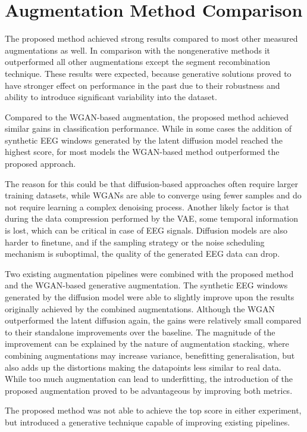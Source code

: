 \section{Augmentation Method Comparison}

The proposed method achieved strong results compared to most other measured augmentations as well. In comparison with the nongenerative methods it outperformed all other augmentations except the segment recombination technique. These results were expected, because generative solutions proved to have stronger effect on performance in the past due to their robustness and ability to introduce significant variability into the dataset. 

Compared to the WGAN-based augmentation, the proposed method achieved similar gains in classification performance. While in some cases the addition of synthetic EEG windows generated by the latent diffusion model reached the highest score, for most models the WGAN-based method outperformed the proposed approach. 

The reason for this could be that diffusion-based approaches often require larger training datasets, while WGANs are able to converge using fewer samples and do not require learning a complex denoising process. Another likely factor is that during the data compression performed by the VAE, some temporal information is lost, which can be critical in case of EEG signals. Diffusion models are also harder to finetune, and if the sampling strategy or the noise scheduling mechanism is suboptimal, the quality of the generated EEG data can drop.

Two existing augmentation pipelines were combined with the proposed method and the WGAN-based generative augmentation. The synthetic EEG windows generated by the diffusion model were able to slightly improve upon the results originally achieved by the combined augmentations. Although the WGAN outperformed the latent diffusion again, the gains were relatively small compared to their standalone improvements over the baseline. The magnitude of the improvement can be explained by the nature of augmentation stacking, where combining augmentations may increase variance, benefitting generalisation, but also adds up the distortions making the datapoints less similar to real data. While too much augmentation can lead to underfitting, the introduction of the proposed augmentation proved to be advantageous by improving both metrics. 

The proposed method was not able to achieve the top score in either experiment, but introduced a generative technique capable of improving existing pipelines.

